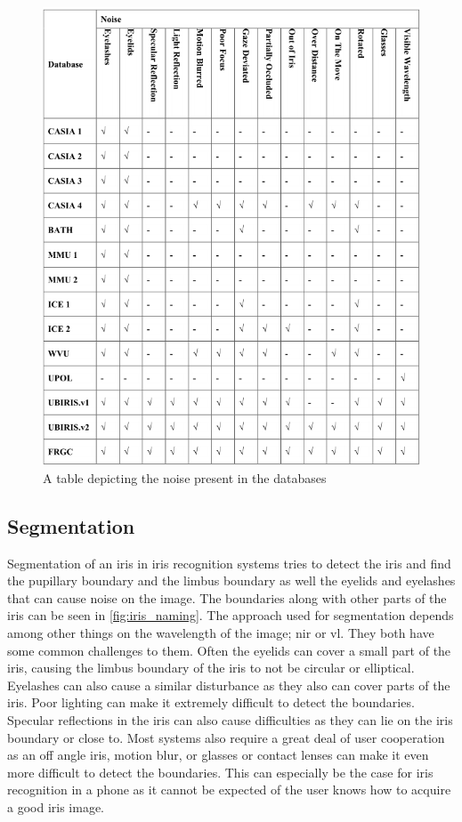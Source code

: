 \begin{figure}[H]
\centering
\includegraphics[width=\textwidth]{figures/Iris_Database_tabel_2.png} 
\caption{A table depicting the noise present in the databases}
\label{fig:Iris_database_2}
\end{figure}


\subsection{Segmentation}
Segmentation of an iris in iris recognition systems tries to detect the iris and find the pupillary boundary and the limbus boundary as well the eyelids and eyelashes that can cause noise on the image. The boundaries along with other parts of the iris can be seen in \autoref{fig:iris_naming}. The approach used for segmentation depends among other things on the wavelength of the image; \gls{nir} or \gls{vl}. They both have some common challenges to them. Often the eyelids can cover a small part of the iris, causing the limbus boundary of the iris to not be circular or elliptical. Eyelashes can also cause a similar disturbance as they also can cover parts of the iris. Poor lighting can make it extremely difficult to detect the boundaries. Specular reflections in the iris can also cause difficulties as they can lie on the iris boundary or close to. Most systems also require a great deal of user cooperation as an off angle iris, motion blur, or glasses or contact lenses can make it even more difficult to detect the boundaries. This can especially be the case for iris recognition in a phone as it cannot be expected of the user knows how to acquire a good iris image. 


